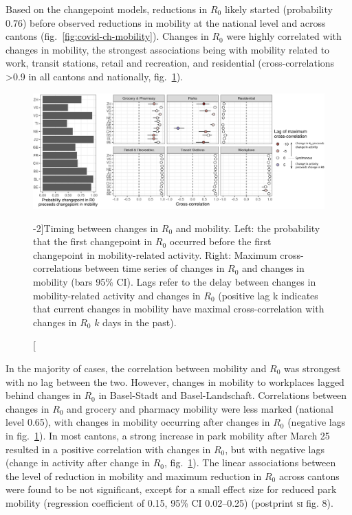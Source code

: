 Based on the changepoint models, reductions in $R_0$ likely started (probability 0.76) before observed reductions in mobility at the national level and across cantons (fig.~\ref{fig:covid-ch-mobility}). Changes in $R_0$ were highly correlated with changes in mobility, the strongest associations being with mobility related to work, transit stations, retail and recreation, and residential (cross-correlations >0.9 in all cantons and nationally, fig.~\ref{fig:covid-ch-timing}). 
\begin{figure}\centering
  \includegraphics[width=\textwidth]{fig_covid-switzerland-npi/FIGURE_4.png}
  \caption[Timing between changes in $R_0$ and mobility][-2\baselineskip]{Timing between changes in $R_0$ and mobility. Left: the probability that the first changepoint in $R_0$ occurred before the first changepoint in mobility-related activity. Right: Maximum cross-correlations between time series of changes in $R_0$ and changes in mobility (bars 95\% CI). Lags refer to the delay between changes in mobility-related activity and changes in $R_0$ (positive lag k indicates that current changes in mobility have maximal cross-correlation with changes in $R_0$ $k$ days in the past).}
  \label{fig:covid-ch-timing}
\end{figure}
In the majority of cases, the correlation between mobility and $R_0$ was strongest with no lag between the two. However, changes in mobility to workplaces lagged behind changes in $R_0$ in Basel-Stadt and Basel-Landschaft. Correlations between changes in $R_0$ and grocery and pharmacy mobility were less marked (national level 0.65), with changes in mobility occurring after changes in $R_0$ (negative lags in fig.~\ref{fig:covid-ch-timing}). In most cantons, a strong increase in park mobility after March 25 resulted in a positive correlation with changes in $R_0$, but with negative lags (change in activity after change in $R_0$, fig.~\ref{fig:covid-ch-timing}). 
The linear associations between the level of reduction in mobility and maximum reduction in $R_0$ across cantons were found to be not significant, except for a small effect size for reduced park mobility (regression coefficient of 0.15, 95\% CI 0.02–0.25) (postprint \textsc{si} fig. 8). 

